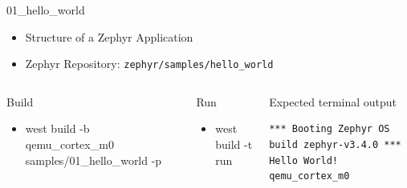 \documentclass[10pt, aspectratio=169]{beamer}
\begin{document}
\begin{frame}[fragile]{01\_hello\_world}

  \begin{itemize}
     \item Structure of a Zephyr Application
     \item Zephyr Repository: \texttt{zephyr/samples/hello\_world}
  \end{itemize}

  \begin{columns}[T,onlytextwidth]
      \begin{block}{Build}
        \begin{itemize}
          \item {\scriptsize west build -b qemu\_cortex\_m0 samples/01\_hello\_world -p}
        \end{itemize}
      \end{block}

     \begin{block}{Run}
        \begin{itemize}
          \item {\scriptsize west build -t run}
        \end{itemize}
      \end{block}



      \begin{exampleblock}{Expected terminal output}

        {\fontsize{7}{9.6}\selectfont
          \begin{verbatim}
*** Booting Zephyr OS build zephyr-v3.4.0 ***
Hello World! qemu_cortex_m0
          \end{verbatim}
        }
      \end{exampleblock}
  \end{columns}
\end{frame}
\end{document}
